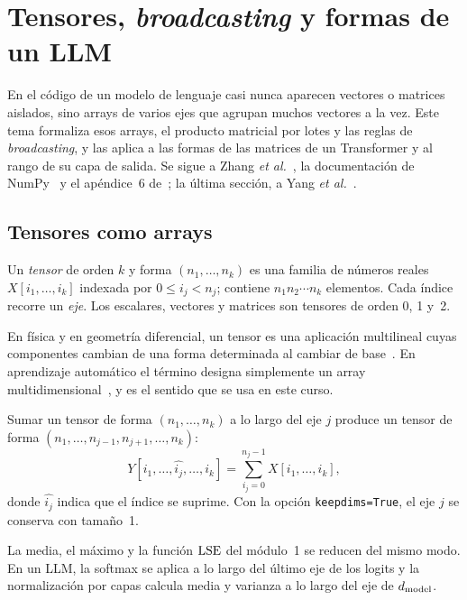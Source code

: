 \chapter{Tensores, \emph{broadcasting} y formas de un LLM}
\label{tema:6}

En el código de un modelo de lenguaje casi nunca aparecen vectores o matrices aislados, sino arrays de varios ejes que agrupan muchos vectores a la vez. Este tema formaliza esos arrays, el producto matricial por lotes y las reglas de \emph{broadcasting}, y las aplica a las formas de las matrices de un Transformer y al rango de su capa de salida. Se sigue a Zhang \emph{et al.}~\cite[§2.1 y §2.3]{d2l}, la documentación de NumPy~\cite{numpy-bc} y el apéndice~6 de~\cite{strang-ila}; la última sección, a Yang \emph{et al.}~\cite{yang-softmax}.

\section{Tensores como arrays}

\begin{definicion}[Tensor]
Un \emph{tensor} de orden $k$ y forma $(n_1,\dots,n_k)$ es una familia de números reales $X[i_1,\dots,i_k]$ indexada por $0\le i_j<n_j$; contiene $n_1n_2\cdots n_k$ elementos. Cada índice recorre un \emph{eje}. Los escalares, vectores y matrices son tensores de orden 0, 1 y~2.
\end{definicion}

En física y en geometría diferencial, un tensor es una aplicación multilineal cuyas componentes cambian de una forma determinada al cambiar de base~\cite[apéndice~6]{strang-ila}. En aprendizaje automático el término designa simplemente un array multidimensional~\cite[§2.3.4]{d2l}, y es el sentido que se usa en este curso.

\begin{definicion}
Sumar un tensor de forma $(n_1,\dots,n_k)$ a lo largo del eje $j$ produce un tensor de forma $(n_1,\dots,n_{j-1},n_{j+1},\dots,n_k)$:
\[
Y[i_1,\dots,\widehat{i_j},\dots,i_k]=\sum_{i_j=0}^{n_j-1}X[i_1,\dots,i_k],
\]
donde $\widehat{i_j}$ indica que el índice se suprime. Con la opción \texttt{keepdims=True}, el eje $j$ se conserva con tamaño~1.
\end{definicion}

La media, el máximo y la función $\operatorname{LSE}$ del módulo~1 se reducen del mismo modo. En un LLM, la softmax se aplica a lo largo del último eje de los logits y la normalización por capas calcula media y varianza a lo largo del eje de $d_{\mathrm{model}}$.

